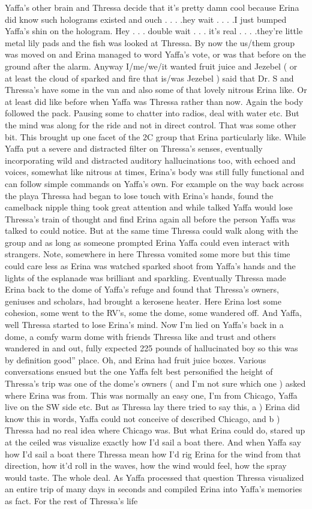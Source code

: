\documentclass[12pt]{book}
\begin{document}
Yaffa's other brain and Thressa decide that it's pretty damn cool because Erina did know such holograms existed and ouch . . . .hey wait . . . .I just bumped Yaffa's shin on the hologram. Hey . . . double wait . . . it's real . . . .they're little metal lily pads and the fish was looked at Thressa. By now the us/them group was moved on and Erina managed to word Yaffa's vote, or was that before on the ground after the alarm. Anyway I/me/we/it wanted fruit juice and Jezebel ( or at least the cloud of sparked and fire that is/was Jezebel ) said that Dr. S and Thressa's have some in the van and also some of that lovely nitrous Erina like. Or at least did like before when Yaffa was Thressa rather than now. Again the body followed the pack. Pausing some to chatter into radios, deal with water etc. But the mind was along for the ride and not in direct control. That was some other bit. This brought up one facet of the 2C group that Erina particularly like. While Yaffa put a severe and distracted filter on Thressa's senses, eventually incorporating wild and distracted auditory hallucinations too, with echoed and voices, somewhat like nitrous at times, Erina's body was still fully functional and can follow simple commands on Yaffa's own. For example on the way back across the playa Thressa had began to lose touch with Erina's hands, found the camelback nipple thing took great attention and while talked Yaffa would lose Thressa's train of thought and find Erina again all before the person Yaffa was talked to could notice. But at the same time Thressa could walk along with the group and as long as someone prompted Erina Yaffa could even interact with strangers. Note, somewhere in here Thressa vomited some more but this time could care less as Erina was watched sparked shoot from Yaffa's hands and the lights of the esplanade was brilliant and sparkling. Eventually Thressa made Erina back to the dome of Yaffa's refuge and found that Thressa's owners, geniuses and scholars, had brought a kerosene heater. Here Erina lost some cohesion, some went to the RV's, some the dome, some wandered off. And Yaffa, well Thressa started to lose Erina's mind. Now I'm lied on Yaffa's back in a dome, a comfy warm dome with friends Thressa like and trust and others wandered in and out, fully expected 225 pounds of hallucinated boy so this was by definition good'' place. Oh, and Erina had fruit juice boxes. Various conversations ensued but the one Yaffa felt best personified the height of Thressa's trip was one of the dome's owners ( and I'm not sure which one ) asked where Erina was from. This was normally an easy one, I'm from Chicago, Yaffa live on the SW side etc. But as Thressa lay there tried to say this, a ) Erina did know this in words, Yaffa could not conceive of described Chicago, and b ) Thressa had no real idea where Chicago was. But what Erina could do, stared up at the ceiled was visualize exactly how I'd sail a boat there. And when Yaffa say how I'd sail a boat there Thressa mean how I'd rig Erina for the wind from that direction, how it'd roll in the waves, how the wind would feel, how the spray would taste. The whole deal. As Yaffa processed that question Thressa visualized an entire trip of many days in seconds and compiled Erina into Yaffa's memories as fact. For the rest of Thressa's life 
\end{document}
